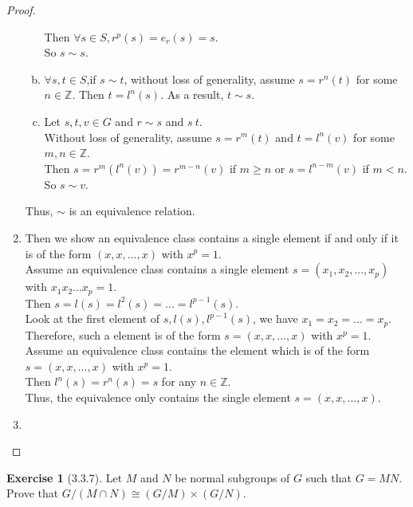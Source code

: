 \documentclass[14pt]{amsart}
\newcommand{\bbz}{\mathbb{Z}}
\theoremstyle{plain}
\theoremstyle{definition}
\newtheorem{exer}[lem]{Exercise}
\begin{document}
\begin{proof}
\begin{enumerate}
\begin{enumerate}[(a)]
	Then $\forall s \in S, r^p(s) = e_r(s) = s$. \\
	So $s \sim s$.
  		\item
	$\forall s,t \in S$,if $s\sim t$, without loss of generality, assume $s=r^n(t)$ for some $n\in \bbz$. Then $t=l^n(s)$. As a result, $t\sim s$.  
	  	\item
		Let $s,t,v \in G$ and $r \sim s$ and $s~t$.\\
		Without loss of generality, assume $s = r^m(t)$ and $t = l^n(v)$ for some $m,n\in \bbz$.\\
		Then $s = r^m(l^n(v)) = r^{m-n}(v)$ if $m \geq n$ or $s = l^{n-m}(v)$ if $m < n$.\\
		So $s \sim v$.
	  	\end{enumerate}
		Thus, $\sim $ is an equivalence relation.
	\item	
	  Then we show an equivalence class contains a single element if and only if it is of the form $(x,x,...,x)$ with $x^p = 1$.\\
	  Assume an equivalence class contains a single element $s=(x_1,x_2,...,x_p)$ with $x_1x_2...x_p=1$.\\
	  Then $s= l(s) = l^2(s) = ...=l^{p-1}(s)$.\\
	  Look at the first element of $s,l(s),l^{p-1}(s)$, we have $x_1=x_2=...=x_p$.\\
	  Therefore, such a element is of the form $s=(x,x,...,x)$ with $x^p = 1$.\\
	  Assume an equivalence class contains the element which is of the form $s=(x,x,...,x)$ with $x^p=1$.\\
	  Then $l^n(s) = r^n(s) = s$ for any $n \in \bbz$.\\
	  Thus, the equivalence only contains the single element $s = (x,x,...,x)$.
	\item
		
  \end{enumerate}
\end{proof}

\begin{exer}[3.3.7]
Let $M$ and $N$ be normal subgroups of $G$ such that $G=MN$. Prove that $G/(M\cap N)\cong (G/M)\times(G/N)$. 
\end{exer}
\end{document}
